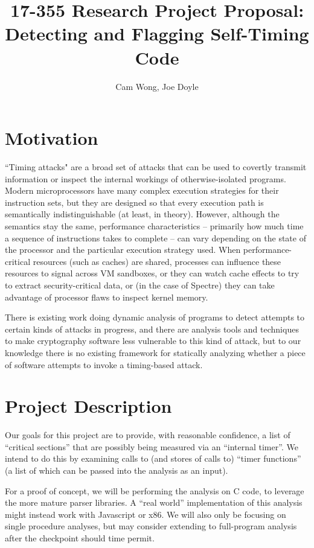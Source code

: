 \documentclass[twocolumn]{article}
\title{17-355 Research Project Proposal: Detecting and Flagging Self-Timing
Code}
\author{Cam Wong, Joe Doyle}
\begin{document}
\maketitle

\section{Motivation}

``Timing attacks" are a broad set of attacks that can be used to
covertly transmit information or inspect the internal workings of
otherwise-isolated programs. Modern microprocessors have many complex
execution strategies for their instruction sets, but they are designed
so that every execution path is semantically indistinguishable (at
least, in theory). However, although the semantics stay the same,
performance characteristics -- primarily how much time a sequence of
instructions takes to complete -- can vary depending on the state of
the processor and the particular execution strategy used. When
performance-critical resources (such as caches) are shared, processes
can influence these resources to signal across VM sandboxes, or they
can watch cache effects to try to extract security-critical data, or
(in the case of Spectre) they can take advantage of processor flaws to
inspect kernel memory.

There is existing work doing dynamic analysis of programs to detect
attempts to certain kinds of attacks in progress, and there are
analysis tools and techniques to make cryptography software less
vulnerable to this kind of attack, but to our knowledge there is no
existing framework for statically analyzing whether a piece of
software attempts to invoke a timing-based attack.

\section{Project Description}

Our goals for this project are to provide, with reasonable confidence,
a list of ``critical sections'' that are possibly being measured via
an ``internal timer''. We intend to do this by examining calls to (and
stores of calls to) ``timer functions'' (a list of which can be passed
into the analysis as an input).

For a proof of concept, we will be performing the analysis on C code,
to leverage the more mature parser libraries. A ``real world''
implementation of this analysis might instead work with Javascript or
x86. We will also only be focusing on single procedure analyses, but
may consider extending to full-program analysis after the checkpoint
should time permit.
\end{document}
